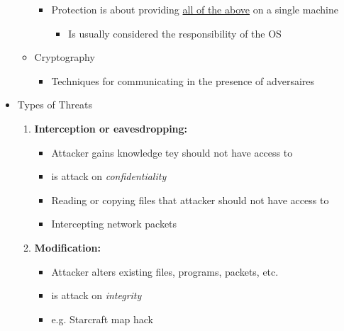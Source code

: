 \documentclass[12pt]{article}
\begin{document}
\begin{itemize}
\begin{itemize}
\begin{itemize}
            \item Protection is about providing \underline{all of the above} on
            a single machine
            \begin{itemize}
                \item Is usually considered the responsibility of the OS
            \end{itemize}
        \end{itemize}
        \item Cryptography
        \begin{itemize}
            \item Techniques for communicating in the presence of adversaires
        \end{itemize}
    \end{itemize}
    \item Types of Threats
    \begin{enumerate}[1.]
        \item \textbf{Interception or eavesdropping:}
        \begin{itemize}
            \item Attacker gains knowledge tey should not have access to
            \item is attack on \textit{confidentiality}
            \item Reading or copying files that attacker should not have access to
            \item Intercepting network packets
        \end{itemize}

        \item \textbf{Modification:}
        \begin{itemize}
            \item Attacker alters existing files, programs, packets, etc.
            \item is attack on \textit{integrity}
            \item e.g. Starcraft map hack
        \end{itemize}


\end{enumerate}
\end{itemize}
\end{document}

